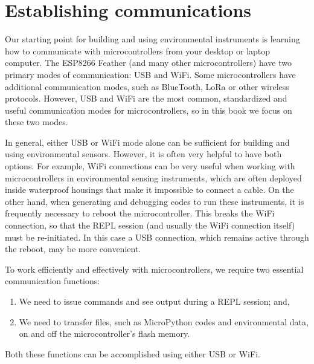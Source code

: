 
%

\section{Establishing communications}

Our starting point for building and using environmental instruments is learning how to communicate with microcontrollers from your desktop or laptop computer.
The ESP8266 Feather (and many other microcontrollers) have two primary modes of communication: USB and WiFi.
Some microcontrollers have additional communication modes, such as BlueTooth, LoRa or other wireless protocols.
However, USB and WiFi are the most common, standardized and useful communication modes for microcontrollers, so in this book we focus on these two modes.

In general, either USB or WiFi mode alone can be sufficient for building and using environmental sensors.
However, it is often very helpful to have both options.
For example, WiFi connections can be very useful when working with microcontrollers in environmental sensing instruments, which are often deployed inside waterproof housings that make it impossible to connect a cable.
On the other hand, when generating and debugging codes to run these instruments, it is frequently necessary to reboot the microcontroller.
This breaks the WiFi connection, so that the REPL session (and usually the WiFi connection itself) must be re-initiated.
In this case a USB connection, which remains active through the reboot, may be more convenient.

To work efficiently and effectively with microcontrollers, we require two essential communication functions:
\begin{enumerate}
	\item We need to issue commands and see output during a REPL session; and,
	\item We need to transfer files, such as MicroPython codes and environmental data, on and off the microcontroller's flash memory.
\end{enumerate}
Both these functions can be accomplished using either USB or WiFi.

